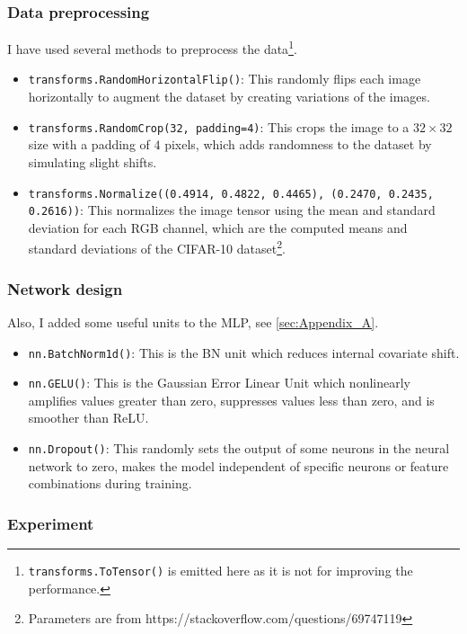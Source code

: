 \documentclass[12pt]{article}
\begin{document}
\subsubsection{Data preprocessing}

I have used several methods to preprocess the data\footnote{\texttt{transforms.ToTensor()} is emitted here as it is not for improving the performance.}.

\begin{itemize}
    \item [1.] \texttt{transforms.RandomHorizontalFlip()}: This randomly flips each image horizontally to augment the dataset by creating variations of the images.
    \item [2.] \texttt{transforms.RandomCrop(32, padding=4)}: This crops the image to a $32\times 32$ size with a padding of $4$ pixels, which adds randomness to the dataset by simulating slight shifts.
    \item [3.] \texttt{transforms.Normalize((0.4914, 0.4822, 0.4465), (0.2470, 0.2435, 0.2616))}: This normalizes the image tensor using the mean and standard deviation for each RGB channel, which are the computed means and standard deviations of the CIFAR-10 dataset\footnote{Parameters are from https://stackoverflow.com/questions/69747119}.
\end{itemize}

\subsubsection{Network design}

Also, I added some useful units to the MLP, see \cref{sec:Appendix_A}.

\begin{itemize}
    \item [1.] \texttt{nn.BatchNorm1d()}: This is the BN unit which reduces internal covariate shift.
    \item [2.] \texttt{nn.GELU()}: This is the Gaussian Error Linear Unit which nonlinearly amplifies values greater than zero, suppresses values less than zero, and is smoother than ReLU.
    \item [3.] \texttt{nn.Dropout()}: This randomly sets the output of some neurons in the neural network to zero, makes the model independent of specific neurons or feature combinations during training.
\end{itemize}

\subsubsection{Experiment}
\end{document}
